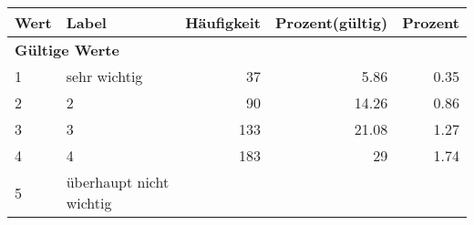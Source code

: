      \begin{longtable}{lXrrr}
     \toprule
     \textbf{Wert} & \textbf{Label} & \textbf{Häufigkeit} & \textbf{Prozent(gültig)} & \textbf{Prozent} \\
     \endhead
     \midrule
     \multicolumn{5}{l}{\textbf{Gültige Werte}}\\

     1 &
     \multicolumn{1}{X}{ sehr wichtig   } &


       \num{37} &
       \num[round-mode=places,round-precision=2]{5,86} &
         \num[round-mode=places,round-precision=2]{0,35} \\

     2 &
     \multicolumn{1}{X}{ 2   } &


       \num{90} &
       \num[round-mode=places,round-precision=2]{14,26} &
         \num[round-mode=places,round-precision=2]{0,86} \\

     3 &
     \multicolumn{1}{X}{ 3   } &


       \num{133} &
       \num[round-mode=places,round-precision=2]{21,08} &
         \num[round-mode=places,round-precision=2]{1,27} \\

     4 &
     \multicolumn{1}{X}{ 4   } &


       \num{183} &
       \num[round-mode=places,round-precision=2]{29} &
         \num[round-mode=places,round-precision=2]{1,74} \\

     5 &
     \multicolumn{1}{X}{ überhaupt nicht wichtig   } &



\end{longtable}
